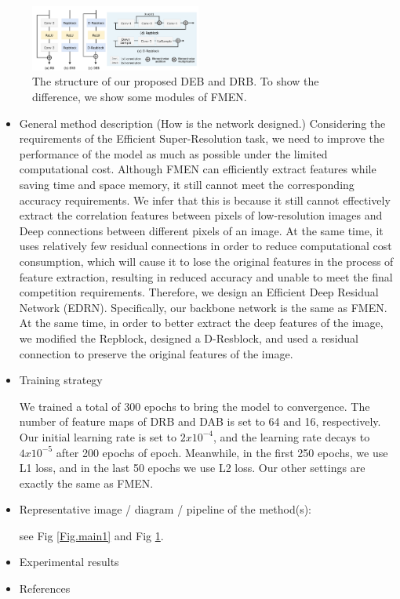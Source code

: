 \documentclass[10pt,twocolumn,letterpaper]{article}
\begin{document}
\begin{figure}[!]
	\centering
	\includegraphics[width=0.5\textwidth]{dab.png}
	\caption{The structure of our proposed DEB and DRB. To show the difference, we show some modules of FMEN.}
	\label{Fig.main}
\end{figure}
\begin{itemize}
\item General method description (How is the network designed.)                                
Considering the requirements of the Efficient Super-Resolution task, we need to improve the performance of the model as much as possible under the limited computational cost. Although FMEN can efficiently extract features while saving time and space memory, it still cannot meet the corresponding accuracy requirements. We infer that this is because it still cannot effectively extract the correlation features between pixels of low-resolution images and Deep connections between different pixels of an image. At the same time, it uses relatively few residual connections in order to reduce computational cost consumption, which will cause it to lose the original features in the process of feature extraction, resulting in reduced accuracy and unable to meet the final competition requirements. Therefore, we design an Efficient Deep Residual Network (EDRN). Specifically, our backbone network is the same as FMEN. At the same time, in order to better extract the deep features of the image, we modified the Repblock, designed a D-Resblock, and used a residual connection to preserve the original features of the image.

\item Training strategy\par
We trained a total of 300 epochs to bring the model to convergence. The number of feature maps of DRB and DAB is set to 64 and 16, respectively. Our initial learning rate is set to $2x10^{-4}$, and the learning rate decays to $4x10^{-5}$ after 200 epochs of epoch. Meanwhile, in the first 250 epochs, we use L1 loss, and in the last 50 epochs we use L2 loss. Our other settings are exactly the same as FMEN.
\item Representative image / diagram / pipeline of the method(s):\par
see Fig \ref{Fig.main1} and Fig \ref{Fig.main}. 
\item Experimental results
\item References                                               
\end{itemize}
\end{document}
